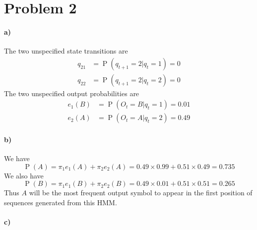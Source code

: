 \documentclass[12pt]{article}
\begin{document}
\section*{Problem 2}

\paragraph{a)}

The two unspecified state transitions are
\begin{align*}
        q_{21}&=\operatorname{P}(q_{t+1}=2|q_t=1)=0\\
        q_{22}&=\operatorname{P}(q_{t+1}=2|q_t=2)=0
\end{align*}
The two unspecified output probabilities are
\begin{align*}
        e_1(B)&=\operatorname{P}(O_t=B|q_t=1)=0.01\\
        e_2(A)&=\operatorname{P}(O_t=A|q_t=2)=0.49
\end{align*}

\paragraph{b)}

We have
\[\operatorname{P}(A)=\pi_1e_1(A)+\pi_2e_2(A)=0.49\times0.99+0.51\times0.49=0.735\]
We also have
\[\operatorname{P}(B)=\pi_1e_1(B)+\pi_2e_2(B)=0.49\times0.01+0.51\times0.51=0.265\]
Thus \(A\) will be the most frequent output symbol to appear in the first position of sequences generated from this HMM.

\paragraph{c)}
\end{document}
